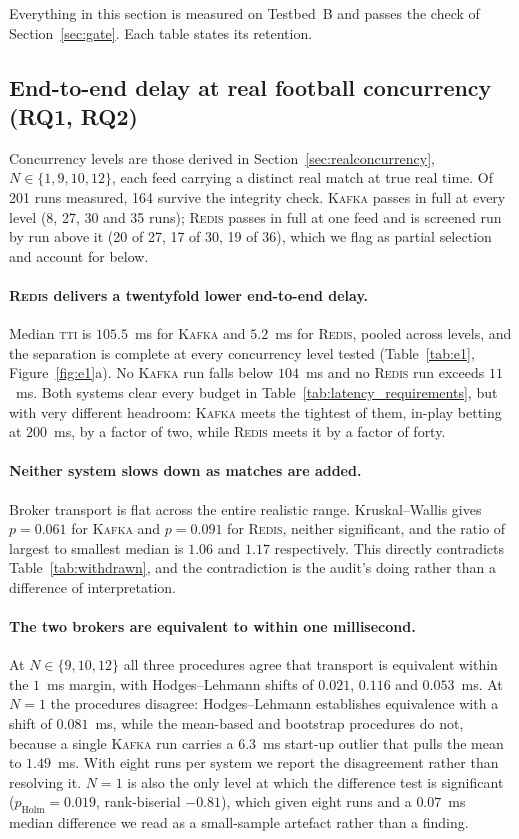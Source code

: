 \documentclass[Afour,sageh,times]{sagej}
\newcommand{\redis}{\textsc{Redis}}
\newcommand{\kafka}{\textsc{Kafka}}
\newcommand{\tti}{\textsc{tti}}
\begin{document}
Everything in this section is measured on Testbed~B and passes the check of
Section~\ref{sec:gate}. Each table states its retention.

\subsection{End-to-end delay at real football concurrency (RQ1, RQ2)}
\label{sec:e1}

Concurrency levels are those derived in Section~\ref{sec:realconcurrency}, $N \in \{1,9,10,12\}$,
each feed carrying a distinct real match at true real time. Of 201 runs measured, 164 survive the
integrity check. \kafka{} passes in full at every level (8, 27, 30 and 35 runs); \redis{} passes
in full at one feed and is screened run by run above it (20 of 27, 17 of 30, 19 of 36), which we
flag as partial selection and account for below.

\paragraph{\redis{} delivers a twentyfold lower end-to-end delay.} Median \tti{} is $105.5$~ms for
\kafka{} and $5.2$~ms for \redis{}, pooled across levels, and the separation is complete at every
concurrency level tested (Table~\ref{tab:e1}, Figure~\ref{fig:e1}a). No \kafka{} run falls below
$104$~ms and no \redis{} run exceeds $11$~ms. Both systems clear every budget in
Table~\ref{tab:latency_requirements}, but with very different headroom: \kafka{} meets the
tightest of them, in-play betting at $200$~ms, by a factor of two, while \redis{} meets it by a
factor of forty.

\paragraph{Neither system slows down as matches are added.} Broker transport is flat across the
entire realistic range. Kruskal--Wallis gives $p = 0.061$ for \kafka{} and $p = 0.091$ for
\redis{}, neither significant, and the ratio of largest to smallest median is $1.06$ and $1.17$
respectively. This directly contradicts Table~\ref{tab:withdrawn}, and the contradiction is the
audit's doing rather than a difference of interpretation.

\paragraph{The two brokers are equivalent to within one millisecond.} At $N \in \{9,10,12\}$ all
three procedures agree that transport is equivalent within the $1$~ms margin, with
Hodges--Lehmann shifts of $0.021$, $0.116$ and $0.053$~ms. At $N{=}1$ the procedures disagree:
Hodges--Lehmann establishes equivalence with a shift of $0.081$~ms, while the mean-based and
bootstrap procedures do not, because a single \kafka{} run carries a $6.3$~ms start-up outlier
that pulls the mean to $1.49$~ms. With eight runs per system we report the disagreement rather
than resolving it. $N{=}1$ is also the only level at which the difference test is significant
($p_{\text{Holm}} = 0.019$, rank-biserial $-0.81$), which given eight runs and a $0.07$~ms median
difference we read as a small-sample artefact rather than a finding.
\end{document}
